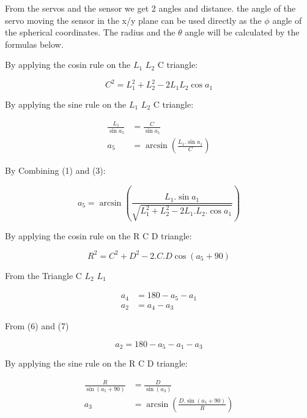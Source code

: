 \documentclass[12pt,twoside,a4paper]{article}
\begin{document}
\begin{flushleft}

From the servos and the sensor we get 2 angles and distance. the angle of the servo moving the sensor in the x/y plane can be used directly as the $\phi$ angle of the spherical coordinates. The radius and the $\theta$ angle will be calculated by the formulas below.
\end{flushleft}

	By applying the cosin rule on the $L_1$ $L_2$ C triangle:

	\begin{equation}
		C^2 = L_1^2 + L_2^2 -2 L_1 L_2 \cos a_1
	\end{equation}

	By applying the sine rule on the $L_1$ $L_2$ C triangle:
	
	\begin{align}
		\frac{L_1}{\sin a_5} &= \frac{C}{\sin a_1}\\
		a_5 &= \arcsin \left(\frac{L_1 . \sin a_1}{C}\right)
	\end{align}
	
	By Combining (1) and (3):
	
	\begin{equation}
		a_5 = \arcsin \left(\frac{L_1 . \sin a_1}{\sqrt{L_1^2 + L_2^2 - 2 L_1.L_2.\cos a_1}}\right)
	\end{equation}
	
	By applying the cosin rule on the R C D triangle:
	
	\begin{equation}
		R^2 = C^2 + D^2 - 2.C.D\cos(a_5+90)
	\end{equation}
	
	From the Triangle C $L_2$ $L_1$
	
	\begin{align}
		a_4 &= 180 - a_5 - a_1\\
		a_2 &= a_4 - a_3
	\end{align}
	
	From (6) and (7)
	
	\begin{equation}
		a_2 = 180 - a_5 - a_1 - a_3
	\end{equation}
	
	By applying the sine rule on the R C D triangle:
	
	\begin{align}
		\frac{R}{\sin(a_5 +90)} &= \frac{D}{\sin(a_3)} \\
		a_3 &= \arcsin \left( \frac {D.\sin(a_5+90)} {R} \right)
	\end{align}
	
\end{document}
